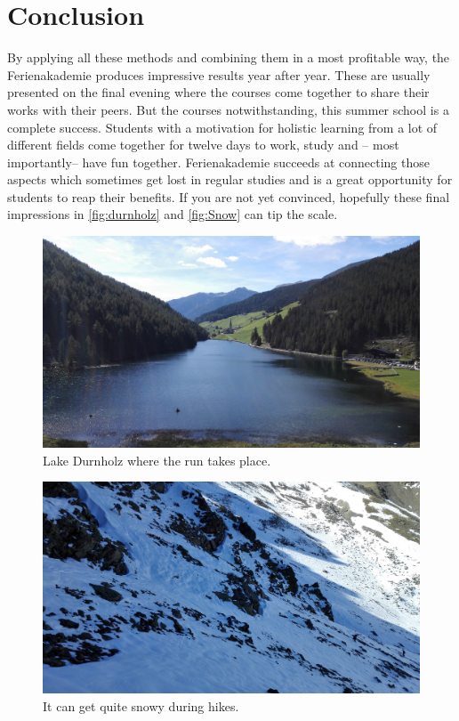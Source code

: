\section{Conclusion}
By applying all these methods and combining them in a most profitable way, the Ferienakademie produces impressive results year after year. These are usually presented on the final evening where the courses come together to share their works with their peers. But the courses notwithstanding, this summer school is a complete success. Students with a motivation for holistic learning from a lot of different fields come together for twelve days to work, study and -- most importantly-- have fun together. Ferienakademie succeeds at connecting those aspects which sometimes get lost in regular studies and is a great opportunity for students to reap their benefits. If you are not yet convinced, hopefully these final impressions in \autoref{fig:durnholz} and \autoref{fig:Snow} can tip the scale.
\begin{figure}[ht]%
 	\begin{center}%
 		\includegraphics[scale=0.045]{img/Durnholz.jpg}%
 		\caption{Lake Durnholz where the run takes place.}\label{fig:durnholz}%
 	\end{center}%
\end{figure}
\begin{figure}[ht]%
 	\begin{center}%
 		\includegraphics[scale=0.045]{img/Snow.jpg}%
 		\caption{It can get quite snowy during hikes.}\label{fig:Snow}%
 	\end{center}%
\end{figure}
